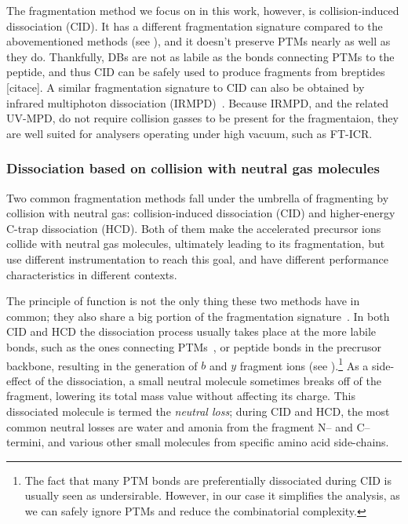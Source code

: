 The fragmentation method we focus on in this work, however, is collision-induced dissociation (CID). It has a different fragmentation signature compared to the abovementioned methods (see ), and it doesn't preserve PTMs nearly as well as they do. Thankfully, DBs are not as labile as the bonds connecting PTMs to the peptide, and thus CID can be safely used to produce fragments from breptides [citace]. A similar fragmentation signature to CID can also be obtained by infrared multiphoton dissociation (IRMPD)~\cite{oomens2006gas}. Because IRMPD, and the related UV-MPD, do not require collision gasses to be present for the fragmentaion, they are well suited for analysers operating under high vacuum, such as FT-ICR\@.

\subsubsection{Dissociation based on collision with neutral gas molecules}

Two common fragmentation methods fall under the umbrella of fragmenting by collision with neutral gas: collision-induced dissociation (CID) and higher-energy C-trap dissociation (HCD). Both of them make the accelerated precursor ions collide with neutral gas molecules, ultimately leading to its fragmentation, but use different instrumentation to reach this goal, and have different performance characteristics in different contexts.

The principle of function is not the only thing these two methods have in common; they also share a big portion of the fragmentation signature~\cite{michalski2012systematic}. In both CID and HCD the dissociation process usually takes place at the more labile bonds, such as the ones connecting PTMs~\cite{quan2013cid}, or peptide bonds in the precrusor backbone, resulting in the generation of \(b\) and \(y\) fragment ions (see ).\footnote{The fact that many PTM bonds are preferentially dissociated during CID is usually seen as undersirable. However, in our case it simplifies the analysis, as we can safely ignore PTMs and reduce the combinatorial complexity.} As a side-effect of the dissociation, a small neutral molecule sometimes breaks off of the fragment, lowering its total mass value without affecting its charge. This dissociated molecule is termed the \emph{neutral loss}; during CID and HCD, the most common neutral losses are water and amonia from the fragment N-- and C-- termini, and various other small molecules from specific amino acid side-chains.

